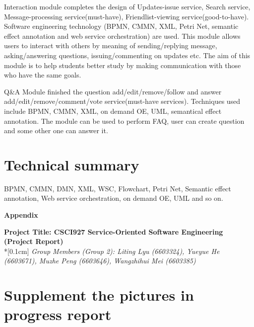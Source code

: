 \documentclass[runningheads]{llncs}
\begin{document}
Interaction module completes the design of Updates-issue service, Search service, Message-processing service(must-have), Friendlist-viewing service(good-to-have). Software engineering technology (BPMN, CMMN, XML, Petri Net, semantic effect annotation and web service orchestration) are used. This module allows users to interact with others by meaning of sending/replying message, asking/answering questions, issuing/commenting on updates etc. The aim of this module is to help students better study by making communication with those who have the same goals.


Q\&A Module finished the question add/edit/remove/follow and answer add/edit/remove/comment/vote service(must-have services).  Techniques used include BPMN, CMMN, XML, on demand OE, UML, semantical effect annotation. The module can be used to perform FAQ, user can create question and some other one can answer it.
\section{Technical summary}
BPMN, CMMN, DMN, XML, WSC, Flowchart, Petri Net, Semantic effect annotation, Web service orchestration, on demand OE, UML and so on.

\clearpage
\begin{flushleft}
\huge{\textbf{Appendix}}
\end{flushleft}
\begin{center}
\Large{\textbf{Project Title: CSCI927 Service-Oriented Software Engineering (Project Report) }} \\*[0.1cm]%
\large{\emph{Group Members (Group 2): Liting Lyu (6603324), Yueyue  He (6603671), Muzhe Peng (6603646), Wangzhihui Mei (6603385)}} %
\end{center}


\section{Supplement the pictures in progress report}
\end{document}
